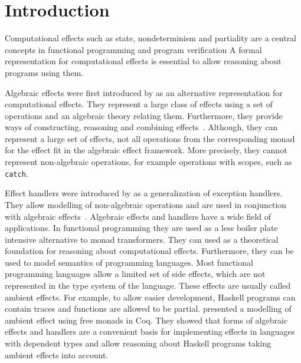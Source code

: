 \documentclass[10pt,a4paper,twoside,notitlepage]{report}
\begin{document}
\chapter{Introduction}

Computational effects such as state, nondeterminism and partiality are a
central concepts in functional programming and program verification
A formal representation for computational effects is essential to allow
reasoning about programs using them.

Algebraic effects were first introduced by
\textcite{DBLP:journals/acs/PlotkinP03} as an alternative representation for
computational effects.
They represent a large class of effects using a set of operations and an
algebraic theory relating them.
Furthermore, they provide ways of constructing, reasoning and combining
effects~\cite{DBLP:journals/corr/PlotkinP13}.
Although, they can represent a large set of effects, not all operations from the
corresponding monad for the effect fit in the algebraic effect framework.
More precisely, they cannot represent non-algebraic operations, for example
operations with scopes, such as
\texttt{catch}\textcite{DBLP:journals/acs/PlotkinP03}.

Effect handlers were introduced by \textcite{DBLP:conf/esop/PlotkinP09} as a
generalization of exception handlers.
They allow modelling of non-algebraic operations and are used in conjunction
with algebraic effects~\cite{DBLP:journals/corr/PlotkinP13}.
Algebraic effects and handlers have a wide field of applications.
In functional programming they are used as a less boiler plate intensive
alternative to monad transformers.
They can used as a theoretical foundation for reasoning about computational
effects.
Furthermore, they can be used to model semantics of programming languages.
Most functional programming languages allow a limited set of side
effects, which are not represented in the type system of the language.
These effects are usually called ambient effects.
For example, to allow easier development, Haskell programs can contain traces
and functions are allowed to be partial.
\textcite{DBLP:journals/programming/DylusCT19,DBLP:conf/haskell/ChristiansenDB19}
presented a modelling of ambient effect using free monads in Coq.
They showed that forms of algebraic effects and handlers are a convenient basis
for implementing effects in languages with dependent types and allow reasoning
about Haskell programs taking ambient effects into account.
\end{document}
